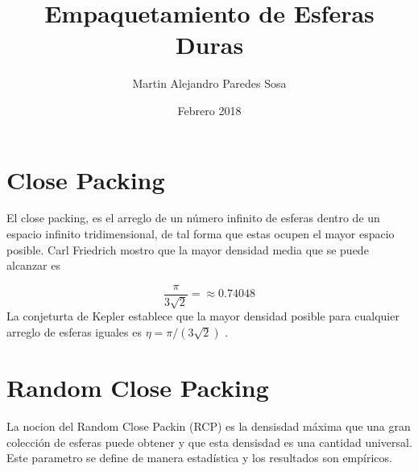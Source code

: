 \documentclass[12pt, journal, a4paper, onecolumn]{IEEEtran}
\author{Martin Alejandro Paredes Sosa}
\title{Empaquetamiento de Esferas Duras}
\date{Febrero 2018}
\begin{document}
\maketitle

\section*{Close Packing}
El close packing, es el arreglo de un número infinito de esferas dentro de un espacio infinito tridimensional, de tal forma que estas ocupen el mayor espacio posible. Carl Friedrich mostro que la mayor densidad media que se puede alcanzar es \cite{wikipedia_2018}

\begin{equation}
	\frac{\pi}{3\sqrt{2}} = \approx 0.74048
	\label{Dens}
\end{equation}
La conjeturta de Kepler establece que la mayor densidad posible para cualquier arreglo de esferas iguales es $\eta = \pi/(3\sqrt{2})$ \cite{eric}.








\section*{Random Close Packing}
La nocion del Random Close Packin (RCP) es la densisdad máxima que una gran colección de esferas puede obtener y que esta densisdad es una cantidad universal. \cite{torquato} Este parametro se define de manera estadística y los resultados son empíricos.























\nocite{*}


\end{document}

